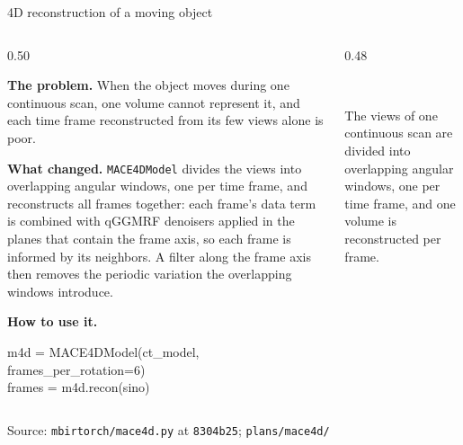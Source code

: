 \documentclass[aspectratio=169,10pt]{beamer}
\newcommand{\tagchip}[2]{{\setlength{\fboxsep}{2.5pt}\setlength{\fboxrule}{0.6pt}%
  \fcolorbox{white}{#1}{\textcolor{white}{\footnotesize\bfseries\strut #2}}}}
\newcommand{\onbranch}{\tagchip{branchAmber}{BRANCH}}
\newcommand{\source}[1]{\par\vfill{\scriptsize\textcolor{inkGray}{Source: #1}\par}}
\newcommand{\figcaption}[1]{{\scriptsize\textcolor{inkGray}{#1}\par}}
\newcommand{\head}[1]{\textbf{#1}}
\begin{document}
\begin{frame}{4D reconstruction of a moving object \hfill \onbranch}
  \begin{columns}[T]
    \begin{column}{0.50\textwidth}
      {\small
      \head{The problem.}  When the object moves during one continuous scan,
      one volume cannot represent it, and each time frame reconstructed from
      its few views alone is poor.\par\vspace{4pt}
      \head{What changed.}  \texttt{MACE4DModel} divides the views into
      overlapping angular windows, one per time frame, and reconstructs all
      frames together: each frame's data term is combined with qGGMRF
      denoisers applied in the planes that contain the frame axis, so each
      frame is informed by its neighbors.  A filter along the frame axis then
      removes the periodic variation the overlapping windows
      introduce.\par\vspace{4pt}
      \head{How to use it.}\par\vspace{2pt}
      {\scriptsize\ttfamily
      m4d = MACE4DModel(ct\_model,\\
      \hphantom{m4d = }frames\_per\_rotation=6)\\
      frames = m4d.recon(sino)\par}}
    \end{column}
    \begin{column}{0.48\textwidth}
      \centering
      \\[4pt]
      \figcaption{The views of one continuous scan are divided into
      overlapping angular windows, one per time frame, and one volume is
      reconstructed per frame.}
    \end{column}
  \end{columns}
  \source{\texttt{mbirtorch/mace4d.py} at \texttt{8304b25}; \texttt{plans/mace4d/}}
\end{frame}
\end{document}
